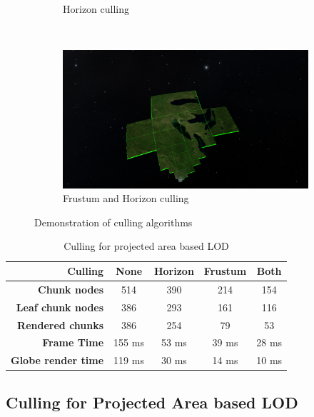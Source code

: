 \begin{figure}[htbp]
\begin{subfigure}[bt]{0.48\textwidth}
        \caption{Horizon culling}
    \end{subfigure}
    ~
    \begin{subfigure}[bt]{0.48\textwidth}
        \includegraphics[width=\textwidth]{figures/results/culling/dhf.png}
        \caption{Frustum and Horizon culling}
    \end{subfigure}
    \caption{Demonstration of culling algorithms}
    \label{fig:cullingd}
\end{figure}

\begin{table}
\centering
\caption[]{Culling for projected area based LOD}
  \label{table:cullingd}
  \begin{tabular}{| r | c c c c |}
    \hline
      \textbf{Culling}            & \textbf{None}  & \textbf{Horizon} & \textbf{Frustum}  & \textbf{Both} \\ \hline
      \textbf{Chunk nodes}        & 514            & 390              & 214               & 154 \\ 
      \textbf{Leaf chunk nodes}   & 386            & 293              & 161               & 116 \\ 
      \textbf{Rendered chunks}    & 386            & 254              & 79                & 53 \\
      \textbf{Frame Time}         & 155 ms         & 53 ms            & 39 ms             & 28 ms \\
      \textbf{Globe render time}  & 119 ms         & 30 ms            & 14 ms             & 10 ms \\
    \hline
  \end{tabular}
\end{table}


\subsection{Culling for Projected Area based LOD}

